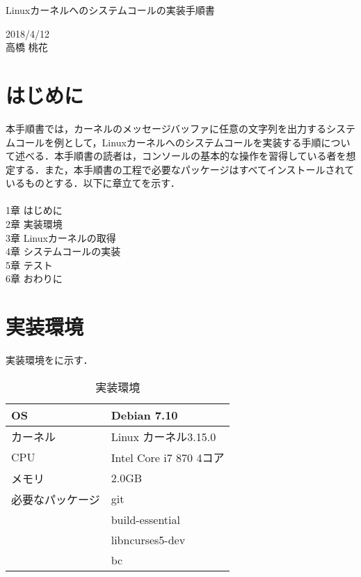 \documentclass[12pt]{jsarticle}
\begin{document}
\begin{center}
{\LARGE Linuxカーネルへのシステムコールの実装手順書}
\end{center}

\begin{flushright}
  2018/4/12\\
  高橋 桃花
\end{flushright}
\section{はじめに}
\label{sec:introduction}
本手順書では，カーネルのメッセージバッファに任意の文字列を出力するシステムコールを例として，Linuxカーネルへのシステムコールを実装する手順について述べる．本手順書の読者は，コンソールの基本的な操作を習得している者を想定する．また，本手順書の工程で必要なパッケージはすべてインストールされているものとする．以下に章立てを示す． \\ \\
1章 はじめに \\
2章 実装環境 \\
3章 Linuxカーネルの取得 \\
4章 システムコールの実装 \\
5章 テスト \\
6章 おわりに \\

\section{実装環境}
\label{sec:devenv}
実装環境をに示す．

\begin{table}[h]
  \begin{center}
    \caption{実装環境}\label{tab:devenv_table}
    \begin{tabular}{l|l}
      \hline \hline
      OS & Debian 7.10 \\ \hline
      カーネル & Linux カーネル3.15.0 \\ \hline
      CPU & Intel Core i7 870 4コア\\ \hline
      メモリ & 2.0GB \\ \hline
      必要なパッケージ & git \\ 
      & build-essential \\ 
      & libncurses5-dev \\ 
      & bc \\ \hline
      
    \end{tabular}
  \end{center}
\end{table}
\end{document}
